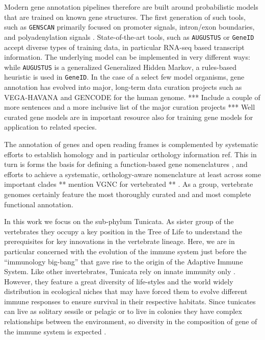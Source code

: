 \documentclass[11pt]{article}
\newcommand{\TODO}[1]{\begingroup\color{red}#1\endgroup}
\newcommand{\PFS}[1]{\begingroup\color{blue}#1\endgroup}
\begin{document}
  \PFS{Modern gene annotation pipelines therefore are built around
  probabilistic models that are trained on known gene structures. The first
  generation of such tools, such as \texttt{GENSCAN} \cite{genescan}
  primarily focused on promoter signals, intron/exon boundaries, and
  polyadenylation signals \cite{claverie}. State-of-the-art tools, such as
  \texttt{AUGUSTUS} \cite{augustus} or \texttt{GeneID} \cite{Blanco:2007}
  accept diverse types of training data, in particular RNA-seq based
  transcript information. The underlying model can be implemented in very
  different ways: while \texttt{AUGUSTUS} is a generalized Generalized
  Hidden Markov, a rules-based heuristic is used in \texttt{GeneID}. In the
  case of a select few model organisms, gene annotation has evolved into
  major, long-term data curation projects such as VEGA-HAVANA and GENCODE
  for the human genome. \TODO{*** Include a couple of more sentences and a
  more inclusive list of the major curation projects ***} Well curated
  gene models are in important resource also for training gene models for
  application to related species.}
  
  \PFS{The annotation of genes and open reading frames is complemented by
  systematic efforts to establish homology \-\- and in particular orthology
  \-\- information \TODO{ref}. This in turn is forms the basis for defining a
  function-based gene nomenclatures \cite{Braschi:2017}, and efforts to
  achieve a systematic, orthology-aware nomenclature at least across some
  important clades \TODO{** mention VGNC for vertebrated **}
  \cite{aken2016ensembl, birney2004overview}. As a group, vertebrate
  genomes certainly feature the most thoroughly curated and and most
  complete functional annotation.}

In this work we focus on the sub-phylum Tunicata. As sister group of the
vertebrates they occupy a key position in the Tree of Life to understand
the prerequisites for key innovations in the vertebrate lineage. Here, we
are in particular concerned with the evolution of the immune system just
before the ``immunology big-bang'' \cite{bernstein1996} that gave rise to
the origin of the Adaptive Immune System. Like other invertebrates,
Tunicata rely on innate immunity only \cite{franchi2017}. However, they
feature a great diversity of life-styles and the world widely distribution
in ecological niches that may have forced them to evolve different immune
responses to ensure survival in their respective habitats. Since tunicates
can live as solitary sessile or pelagic or to live in colonies they have
complex relationships between the environment, so diversity in the
composition of gene of the immune system is expected
\cite{carroll2008evo,berna2014evolutionary}.
\end{document}

